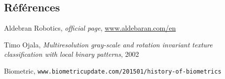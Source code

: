 \begin{thebibliography}{99999}
\section{Références}
\singlespace\normalsize


 Aldebran Robotics, \textit{ official page}, \url{www.aldebaran.com/en}

 Timo Ojala, \textit{Multiresolution gray-scale and rotation invariant texture classification with local binary patterns}, 2002

 Biometric, \texttt{www.biometricupdate.com/201501/history-of-biometrics}


\end{thebibliography}
